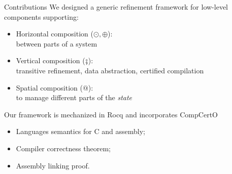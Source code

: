 \documentclass[aspectratio=1610,mathserif]{beamer}
\newcommand{\kw}[1]{\ensuremath{ \mathrm{#1} }}
\begin{document}
\begin{frame}{Contributions} %
  We designed a generic refinement framework for low-level components supporting:
  \begin{itemize}
    \item Horizontal composition ($\odot, \oplus$): \\
      between parts of a system
    \item Vertical composition ($\fatsemi$): \\
      transitive refinement, data abstraction, certified compilation
    \item Spatial composition ($\mathbin@$): \\
      to manage different parts of the \emph{state}
  \end{itemize}

%

  \pause
  Our framework is mechanized in Rocq and incorporates CompCertO
  \begin{itemize}
    \item Languages semantics for C and assembly;
    \item Compiler correctness theorem;
    \item Assembly linking proof.
  \end{itemize}

%
\end{frame}
\end{document}

